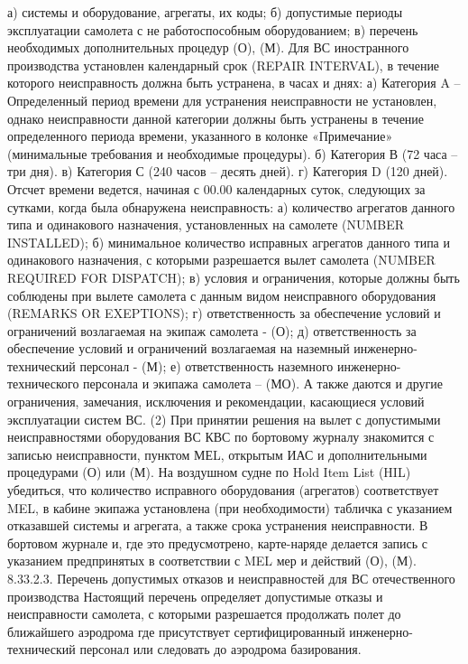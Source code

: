а)	системы и оборудование, агрегаты, их коды;
б)	допустимые периоды эксплуатации самолета с не работоспособным оборудованием;
в)	перечень необходимых дополнительных процедур (О), (М).
Для ВС иностранного производства установлен календарный срок (REPAIR INTERVAL), в течение которого неисправность должна быть устранена, в часах и днях: 
а)	Категория A – Определенный период времени для устранения неисправности не установлен, однако неисправности данной категории должны быть устранены в течение определенного периода времени, указанного в колонке «Примечание» (минимальные требования и необходимые процедуры).
б)	Категория В (72 часа – три дня).
в)	Категория С (240 часов – десять дней).
г)	Категория D (120 дней). 
Отсчет времени ведется, начиная с 00.00 календарных суток, следующих за сутками, когда была обнаружена неисправность:
а)	количество агрегатов данного типа и одинакового назначения, установленных на самолете (NUMBER INSTALLED);
б)	минимальное количество исправных агрегатов данного типа и одинакового назначения, с которыми разрешается вылет самолета (NUMBER REQUIRED FOR DISPATCH);
в)	условия и ограничения, которые должны быть соблюдены при вылете самолета с данным видом неисправного оборудования (REMARKS OR EXEPTIONS);
г)	ответственность за обеспечение условий и ограничений возлагаемая на экипаж самолета - (О);
д)	ответственность за обеспечение условий и ограничений возлагаемая на наземный инженерно-технический персонал - (М);
е)	ответственность наземного инженерно-технического персонала и экипажа самолета – (МО).
А также даются и другие ограничения, замечания, исключения и рекомендации, касающиеся условий эксплуатации систем ВС.
(2) При принятии решения на вылет с допустимыми неисправностями оборудования ВС КВС по бортовому журналу знакомится с записью неисправности, пунктом МЕL, открытым ИАС и дополнительными процедурами (О) или (М). На воздушном судне по Hold Item List (HIL) убедиться, что количество исправного оборудования (агрегатов) соответствует MEL, в кабине экипажа установлена (при необходимости) табличка с указанием отказавшей системы и агрегата, а также срока устранения неисправности. В бортовом журнале и, где это предусмотрено, карте-наряде делается запись с указанием предпринятых в соответствии с MEL мер и действий (О), (М).
            8.33.2.3.	Перечень допустимых отказов и неисправностей для ВС отечественного производства
Настоящий перечень определяет допустимые отказы и неисправности самолета, с которыми разрешается продолжать полет до ближайшего аэродрома где присутствует сертифицированный инженерно-технический персонал или следовать до аэродрома базирования. 
